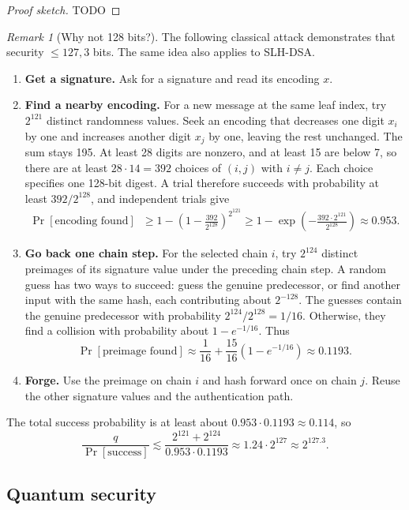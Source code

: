 \documentclass[11pt]{article}
\theoremstyle{definition}
\theoremstyle{plain}
\theoremstyle{remark}
\newtheorem{remark}[definition]{Remark}
\begin{document}
\begin{proof}[Proof sketch]
TODO
\end{proof}

\begin{remark}[Why not 128 bits?]
The following classical attack demonstrates that security $\leq 127,3$ bits. The same idea also applies to SLH-DSA.
\begin{enumerate}[leftmargin=2em]
  \item \textbf{Get a signature.} Ask for a signature and read its encoding $x$.
  \item \textbf{Find a nearby encoding.} For a new message at the same leaf index, try $2^{121}$ distinct randomness values. Seek an encoding that decreases one digit $x_i$ by one and increases another digit $x_j$ by one, leaving the rest unchanged. The sum stays 195. At least 28 digits are nonzero, and at least 15 are below 7, so there are at least $28\cdot14=392$ choices of $(i,j)$ with $i\neq j$. Each choice specifies one 128-bit digest. A trial therefore succeeds with probability at least $392/2^{128}$, and independent trials give
  \[
    \begin{aligned}
      \Pr[\text{encoding found}] &\geq 1-\left(1-\frac{392}{2^{128}}\right)^{2^{121}} \geq 1-\exp\!\left(-\frac{392\cdot2^{121}}{2^{128}}\right)
       \approx0.953.
    \end{aligned}
  \]
  \item \textbf{Go back one chain step.} For the selected chain $i$, try $2^{124}$ distinct preimages of its signature value under the preceding chain step. A random guess has two ways to succeed: guess the genuine predecessor, or find another input with the same hash, each contributing about $2^{-128}$. The guesses contain the genuine predecessor with probability $2^{124}/2^{128}=1/16$. Otherwise, they find a collision with probability about $1-e^{-1/16}$. Thus
  \[
    \Pr[\text{preimage found}]\approx\frac{1}{16}+\frac{15}{16}\left(1-e^{-1/16}\right)\approx0.1193.
  \]
  \item \textbf{Forge.} Use the preimage on chain $i$ and hash forward once on chain $j$. Reuse the other signature values and the authentication path.
\end{enumerate}
The total success probability is at least about $0.953\cdot0.1193\approx0.114$, so
\[
  \frac{q}{\Pr[\text{success}]}\lesssim\frac{2^{121}+2^{124}}{0.953\cdot0.1193}\approx1.24\cdot2^{127}\approx2^{127.3}.
\]
\end{remark}

\subsection{Quantum security}
\label{sec:quantum}
\end{document}
